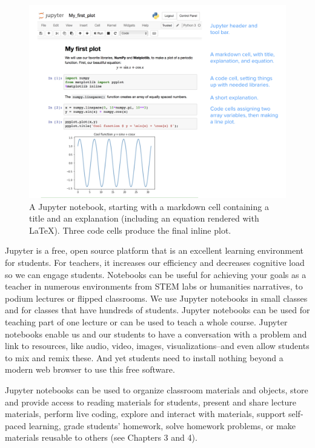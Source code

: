 \documentclass[]{book}
\begin{document}
\begin{figure}
\centering
\includegraphics{images/Fig_notebook.png}
\caption{A Jupyter notebook, starting with a markdown cell containing a title and an explanation (including an equation rendered with LaTeX). Three code cells produce the final inline plot.}
\end{figure}

Jupyter is a free, open source platform that is an excellent learning
environment for students. For teachers, it increases our efficiency and
decreases cognitive load so we can engage students. Notebooks can be useful for
achieving your goals as a teacher in numerous environments from STEM labs or
humanities narratives, to podium lectures or flipped classrooms. We use Jupyter
notebooks in small classes and for classes that have hundreds of students.
Jupyter notebooks can be used for teaching part of one lecture or can be used to
teach a whole course. Jupyter notebooks enable us and our students to have a
conversation with a problem and link to resources, like audio, video, images,
visualizations--and even allow students to mix and remix these. And yet students
need to install nothing beyond a modern web browser to use this free software.

Jupyter notebooks can be used to organize classroom materials and objects, store
and provide access to reading materials for students, present and share lecture
materials, perform live coding, explore and interact with materials, support
self-paced learning, grade students' homework, solve homework problems, or make
materials reusable to others (see Chapters 3 and 4).
\end{document}
